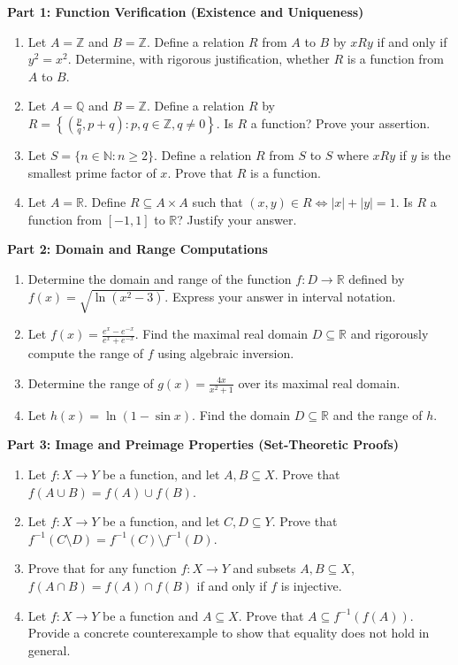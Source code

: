 \documentclass[11pt, letterpaper]{article}
\theoremstyle{definition}
\theoremstyle{remark}
\newcommand{\R}{\mathbb{R}}
\newcommand{\N}{\mathbb{N}}
\newcommand{\Z}{\mathbb{Z}}
\newcommand{\Q}{\mathbb{Q}}
\begin{document}
\textbf{Part 1: Function Verification (Existence and Uniqueness)}
\begin{enumerate}[label=\textbf{\arabic*.}]
    \item Let $A = \Z$ and $B = \Z$. Define a relation $R$ from $A$ to $B$ by $xRy$ if and only if $y^2 = x^2$. Determine, with rigorous justification, whether $R$ is a function from $A$ to $B$.
    \item Let $A = \Q$ and $B = \Z$. Define a relation $R$ by $R = \left\{ \left(\frac{p}{q}, p+q\right) : p, q \in \Z, q \neq 0 \right\}$. Is $R$ a function? Prove your assertion.
    \item Let $S = \{n \in \N : n \ge 2\}$. Define a relation $R$ from $S$ to $S$ where $xRy$ if $y$ is the smallest prime factor of $x$. Prove that $R$ is a function.
    \item Let $A = \R$. Define $R \subseteq A \times A$ such that $(x, y) \in R \iff |x| + |y| = 1$. Is $R$ a function from $[-1, 1]$ to $\R$? Justify your answer.
\end{enumerate}

\textbf{Part 2: Domain and Range Computations}
\begin{enumerate}[label=\textbf{\arabic*.}, resume]
    \item Determine the domain and range of the function $f: D \to \R$ defined by $f(x) = \sqrt{\ln(x^2 - 3)}$. Express your answer in interval notation.
    \item Let $f(x) = \frac{e^x - e^{-x}}{e^x + e^{-x}}$. Find the maximal real domain $D \subseteq \R$ and rigorously compute the range of $f$ using algebraic inversion.
    \item Determine the range of $g(x) = \frac{4x}{x^2 + 1}$ over its maximal real domain.
    \item Let $h(x) = \ln(1 - \sin x)$. Find the domain $D \subseteq \R$ and the range of $h$.
\end{enumerate}

\textbf{Part 3: Image and Preimage Properties (Set-Theoretic Proofs)}
\begin{enumerate}[label=\textbf{\arabic*.}, resume]
    \item Let $f: X \to Y$ be a function, and let $A, B \subseteq X$. Prove that $f(A \cup B) = f(A) \cup f(B)$.
    \item Let $f: X \to Y$ be a function, and let $C, D \subseteq Y$. Prove that $f^{-1}(C \setminus D) = f^{-1}(C) \setminus f^{-1}(D)$.
    \item Prove that for any function $f: X \to Y$ and subsets $A, B \subseteq X$, $f(A \cap B) = f(A) \cap f(B)$ if and only if $f$ is injective.
    \item Let $f: X \to Y$ be a function and $A \subseteq X$. Prove that $A \subseteq f^{-1}(f(A))$. Provide a concrete counterexample to show that equality does not hold in general.
\end{enumerate}
\end{document}
